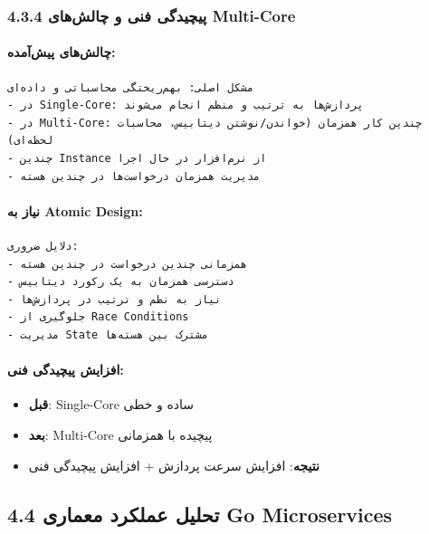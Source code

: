 \documentclass[
]{article}
\providecommand{\tightlist}{%
  \setlength{\itemsep}{0pt}\setlength{\parskip}{0pt}}
\begin{document}
\subsubsection{4.3.4 پیچیدگی فنی و چالش‌های
Multi-Core}\label{ux67eux6ccux686ux6ccux62fux6afux6cc-ux641ux646ux6cc-ux648-ux686ux627ux644ux634ux647ux627ux6cc-multi-core}

\paragraph{چالش‌های
پیش‌آمده:}\label{ux686ux627ux644ux634ux647ux627ux6cc-ux67eux6ccux634ux622ux645ux62fux647}

\begin{verbatim}
مشکل اصلی: بهم‌ریختگی محاسباتی و داده‌ای
- در Single-Core: پردازش‌ها به ترتیب و منظم انجام می‌شوند
- در Multi-Core: چندین کار همزمان (خواندن/نوشتن دیتابیس، محاسبات لحظه‌ای)
- چندین Instance از نرم‌افزار در حال اجرا
- مدیریت همزمان درخواست‌ها در چندین هسته
\end{verbatim}

\paragraph{نیاز به Atomic
Design:}\label{ux646ux6ccux627ux632-ux628ux647-atomic-design}

\begin{verbatim}
دلایل ضروری:
- همزمانی چندین درخواست در چندین هسته
- دسترسی همزمان به یک رکورد دیتابیس
- نیاز به نظم و ترتیب در پردازش‌ها
- جلوگیری از Race Conditions
- مدیریت State مشترک بین هسته‌ها
\end{verbatim}

\paragraph{افزایش پیچیدگی
فنی:}\label{ux627ux641ux632ux627ux6ccux634-ux67eux6ccux686ux6ccux62fux6afux6cc-ux641ux646ux6cc}

\begin{itemize}
\tightlist
\item
  \textbf{قبل}: Single-Core ساده و خطی
\item
  \textbf{بعد}: Multi-Core پیچیده با همزمانی
\item
  \textbf{نتیجه}: افزایش سرعت پردازش + افزایش پیچیدگی فنی
\end{itemize}

\subsection{4.4 تحلیل عملکرد معماری Go
Microservices}\label{ux62aux62dux644ux6ccux644-ux639ux645ux644ux6a9ux631ux62f-ux645ux639ux645ux627ux631ux6cc-go-microservices}
\end{document}
